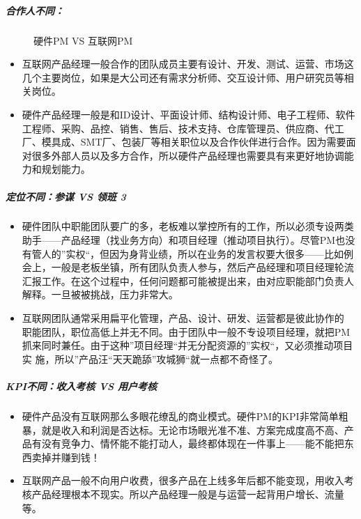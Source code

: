 \documentclass[letterpaper,10pt,english]{sphinxmanual}
\begin{document}
\subparagraph{合作人不同：}
\label{\detokenize{chapter_project/AI_hardware:id4}}
\begin{figure}[H]
\centering
\capstart

\noindent{}
\caption{硬件PM VS 互联网PM}\label{\detokenize{chapter_project/AI_hardware:id35}}\end{figure}
\begin{itemize}
\item {} 
互联网产品经理一般合作的团队成员主要有设计、开发、测试、运营、市场这几个主要岗位，如果是大公司还有需求分析师、交互设计师、用户研究员等相关岗位。

\item {} 
硬件产品经理一般是和ID设计、平面设计师、结构设计师、电子工程师、软件工程师、采购、品控、销售、售后、技术支持、仓库管理员、供应商、代工厂、模具成、SMT厂、包装厂等相关职位以及合作伙伴进行合作。因为需要面对很多外部人员以及多方合作，所以硬件产品经理也需要具有来更好地协调能力和规划能力。

\end{itemize}


\subparagraph{定位不同：参谋 VS 领班 3\sphinxfootnotemark[789]}
\label{\detokenize{chapter_project/AI_hardware:vs-3}}%
\begin{footnotetext}[789]\sphinxAtStartFootnote
{}
%
\end{footnotetext}\ignorespaces \begin{itemize}
\item {} 
硬件团队中职能团队要广的多，老板难以掌控所有的工作，所以必须专设两类助手——产品经理（找业务方向）和项目经理（推动项目执行）。尽管PM也没有管人的”实权“，但因为身背业绩，所以在业务的发言权要大很多——比如例会上，一般是老板坐镇，所有团队负责人参与，然后产品经理和项目经理轮流汇报工作。在这个过程中，任何问题都可能被提出来，由对应职能部门负责人解释。一旦被被挑战，压力非常大。

\item {} 
互联网团队通常采用扁平化管理，产品、设计、研发、运营都是彼此协作的
职能团队，职位高低上并无不同。由于团队中一般不专设项目经理，就把PM抓来同时兼任。由于这种”项目经理“并无分配资源的”实权“，又必须推动项目实
施，所以”产品汪“天天跪舔”攻城狮“就一点都不奇怪了。

\end{itemize}


\subparagraph{KPI不同：收入考核 VS 用户考核}
\label{\detokenize{chapter_project/AI_hardware:kpi-vs}}\begin{itemize}
\item {} 
硬件产品没有互联网那么多眼花缭乱的商业模式。硬件PM的KPI非常简单粗暴，就是收入和利润是否达标。无论市场眼光准不准、方案完成度高不高、产品有没有竞争力、情怀能不能打动人，最终都体现在一件事上——能不能把东西卖掉并赚到钱！

\item {} 
互联网产品一般不向用户收费，很多产品在上线多年后都不能变现，用收入考核产品经理根本不现实。所以产品经理一般是与运营一起背用户增长、流量等。

\end{itemize}
\end{document}
